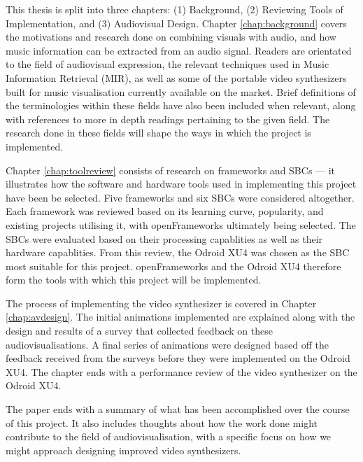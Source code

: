 \documentclass{report}
\begin{document}
This thesis is split into three chapters: (1) Background, (2) Reviewing Tools of Implementation, and (3) Audiovisual Design. Chapter \ref{chap:background} covers the motivations and research done on combining visuals with audio, and how music information can be extracted from an audio signal. Readers are orientated to the field of audiovisual expression, the relevant techniques used in Music Information Retrieval (MIR), as well as some of the portable video synthesizers built for music visualisation currently available on the market. Brief definitions of the terminologies within these fields have also been included when relevant, along with references to more in depth readings pertaining to the given field. The research done in these fields will shape the ways in which the project is implemented. \par

Chapter \ref{chap:toolreview} consists of research on frameworks and SBCs --- it illustrates how the software and hardware tools used in implementing this project have been be selected. Five frameworks and six SBCs were considered altogether. Each framework was reviewed based on its learning curve, popularity, and existing projects utilising it, with openFrameworks ultimately being selected. The SBCs were evaluated based on their processing capablities as well as their hardware capablities. From this review, the Odroid XU4 was chosen as the SBC most suitable for this project. openFrameworks and the Odroid XU4 therefore form the tools with which this project will be implemented. \par

The process of implementing the video synthesizer is covered in Chapter \ref{chap:avdesign}. The initial animations implemented are explained along with the design and results of a survey that collected feedback on these audiovisualisations. A final series of animations were designed based off the feedback received from the surveys before they were implemented on the Odroid XU4. The chapter ends with a performance review of the video synthesizer on the Odroid XU4. \par

The paper ends with a summary of what has been accomplished over the course of this project. It also includes thoughts about how the work done might contribute to the field of audiovisualisation, with a specific focus on how we might approach designing improved video synthesizers.

\end{document}
